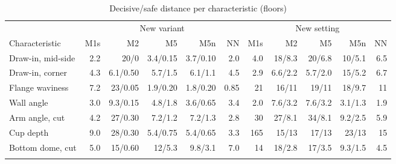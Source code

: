 \documentclass[pdflatex,sn-basic]{sn-jnl}
\newcommand{\tabsize}{\fontsize{8}{9.5}\selectfont}
\begin{document}
\begin{table}[tbp]
\tabsize
\setlength{\tabcolsep}{2.4pt}
\caption{Decisive/safe distance per characteristic (floors)}\label{tab:qcdist}
\begin{tabular}{@{}lrrrrrrrrrr@{}}
\toprule
 & \multicolumn{5}{c}{New variant} & \multicolumn{5}{c}{New setting} \\
\cmidrule(lr){2-6}\cmidrule(lr){7-11}
Characteristic & M1s & M2 & M5 & M5n & NN & M1s & M2 & M5 & M5n & NN \\
\midrule
Draw-in, mid-side & 2.2 & 20/0 & 3.4/0.15 & 3.7/0.10 & 2.0 & 4.0 & 18/8.3 & 20/6.8 & 10/5.1 & 6.5 \\
Draw-in, corner & 4.3 & 6.1/0.50 & 5.7/1.5 & 6.1/1.1 & 4.5 & 2.9 & 6.6/2.2 & 5.7/2.0 & 15/5.2 & 6.7 \\
Flange waviness & 7.2 & 23/0.05 & 1.9/0.20 & 1.8/0.20 & 0.85 & 21 & 16/11 & 19/11 & 18/9.7 & 11 \\
Wall angle & 3.0 & 9.3/0.15 & 4.8/1.8 & 3.6/0.65 & 3.4 & 2.0 & 7.6/3.2 & 7.6/3.2 & 3.1/1.3 & 1.9 \\
Arm angle, cut & 4.2 & 27/0.30 & 7.2/1.2 & 7.2/1.3 & 2.8 & 30 & 27/8.1 & 34/8.1 & 9.2/2.5 & 5.9 \\
Cup depth & 9.0 & 28/0.30 & 5.4/0.75 & 5.4/0.65 & 3.3 & 165 & 15/13 & 17/13 & 23/13 & 15 \\
Bottom dome, cut & 5.0 & 15/0.60 & 12/5.3 & 9.8/3.1 & 7.0 & 14 & 18/2.8 & 17/3.5 & 9.3/1.5 & 4.5 \\
\botrule
\end{tabular}
\end{table}
\end{document}
